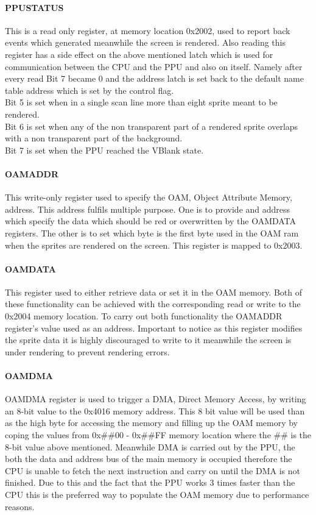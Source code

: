 \documentclass[]{report}
\begin{document}
\paragraph{PPUSTATUS}
This is a read only register, at memory location 0x2002, used to report back events which generated meanwhile the screen is rendered. Also reading this register has a side effect on the above mentioned latch which is used for communication between the CPU and the PPU and also on itself. Namely after every read Bit 7 became 0 and the address latch is set back to the default name table address which is set by the control flag.
\\
Bit 5 is set when in a single scan line more than eight sprite meant to be rendered.
\\
Bit 6 is set when any of the non transparent part of a rendered sprite overlaps with a non transparent part of the background.
\\
Bit 7 is set when the PPU reached the VBlank state.

\paragraph{OAMADDR}
This write-only register used to specify the OAM, Object Attribute Memory, address. This address fulfils multiple purpose. One is to provide and address which specify the data which should be red or overwritten by the OAMDATA registers. The other is to set which byte is the first byte used in the OAM ram when the sprites are rendered on the screen. This register is mapped to 0x2003.

\paragraph{OAMDATA}
This register used to either retrieve data or set it in the OAM memory. Both of these functionality can be achieved with the corresponding read or write to the 0x2004 memory location. To carry out both functionality the OAMADDR register's value used as an address. Important to notice as this register modifies the sprite data it is highly discouraged to write to it meanwhile the screen is under rendering to prevent rendering errors.

\paragraph{OAMDMA}
OAMDMA register is used to trigger a DMA, Direct Memory Access, by writing an 8-bit value to the 0x4016 memory address. This 8 bit value will be used than as the high byte for accessing the memory and filling up the OAM memory by coping the values from 0x\#\#00 - 0x\#\#FF memory location where the \#\# is the 8-bit value above mentioned. Meanwhile DMA is carried out by the PPU, the both the data and address bus of the main memory is occupied therefore the CPU is unable to fetch the next instruction and carry on until the DMA is not finished. Due to this and the fact that the PPU works 3 times faster than the CPU this is the preferred way to populate the OAM memory due to performance reasons.
\end{document}
